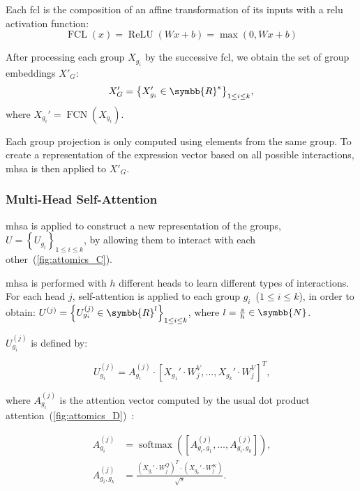 \documentclass[../main.tex]{subfiles}
\begin{document}
	        Each \gls{fcl} is the composition of an affine transformation of its inputs with a \gls{relu} activation function:
	        \[ \operatorname{FCL}\left(x\right) = \operatorname{ReLU}\left(Wx+b \right) = \max\left(0, Wx+b\right) \]

	        After processing each group \(X_{g_i}\) by the successive \gls{fcl}, we obtain the set of group embeddings \(X'_G\):
	        \[ X_G' = {\left\{ X_{g_i}' \in \symbb{R}^{s}\right\}}_{1 \leq i \leq k} \text{,} \]
	        where \(X_{g_i}' = \operatorname{FCN}\left(X_{g_i}\right)\).

	        Each group projection is only computed using elements from the same group.
	        To create a representation of the expression vector based on all possible interactions, \gls{mhsa} is then applied to \(X'_G\).

	    \subsubsection{Multi-Head Self-Attention}

	        \Gls{mhsa} is applied to construct a new representation of the groups, \(U = {\left\{ U_{g_i}\right\}}_{1 \leq i \leq k}\), by allowing them to interact with each other~(\cref{fig:attomics_C}).

	        \Gls{mhsa} is performed with \(h\) different heads to learn different types of interactions.
	        For each head \(j\), self-attention is applied to each group \(g_i\)~(\(1 \leq i \leq k \)), in order to obtain: \(U^{(j)} = {\left\{ U^{(j)}_{g_i} \in \symbb{R}^{l} \right\}}_{1 \leq i \leq k}\), where \(l = \frac{s}{h} \in \symbb{N}\).

	        \(U^{(j)}_{g_i}\) is defined by:

	        \[ U^{(j)}_{g_i} = A^{(j)}_{g_i} \cdot {\left[ X_{g_1}' \cdot W_j^V, \ldots ,  X_{g_k}' \cdot W_j^V\right]}^T \text{,}\]

	        where \(A^{(j)}_{g_i}\) is the attention vector computed by the usual dot product attention~(\cref{fig:attomics_D})~\cite{AttentionAllYouNeed}:

	        \begin{align*}
	            A^{(j)}_{g_i}      & = \operatorname{softmax}\left(\left[A^{(j)}_{g_i,g_1}, \ldots,  A^{(j)}_{g_i,g_k}\right]\right) \text{,}    \\
	            A^{(j)}_{g_i, g_k} & =  \frac{{\left(X_{g_i}' \cdot W_j^Q\right)}^T \cdot \left(X_{g_k}' \cdot W_j^K \right)}{\sqrt{s}} \text{.}
	        \end{align*}
\end{document}
